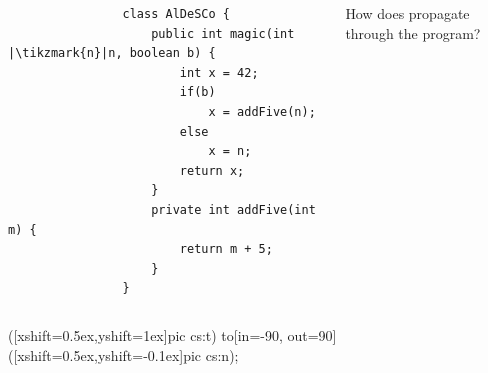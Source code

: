 \documentclass[aspectratio=169, usepdftitle=false, xcolor={dvipsnames}]{beamer}
\begin{document}
\begin{frame}[fragile]
{}
	\begin{columns}[c]
		\begin{column}{0.55\textwidth}
			\begin{dottedborder}
			\begin{verbatim}
				class AlDeSCo {
					public int magic(int |\tikzmark{n}|n, boolean b) {
						int x = 42;
						if(b)
							x = addFive(n);
						else
							x = n;
						return x;
					}
					private int addFive(int m) {
						return m + 5;
					}
				}
			\end{verbatim}
			\end{dottedborder}
		\end{column}
		\begin{column}{0.35\textwidth}
			\block How does  propagate through the program?\endblock\bigskip
			\centerline{}
		\end{column}
	\end{columns}
	 ([xshift=0.5ex,yshift=1ex]pic cs:t) to[in=-90, out=90] ([xshift=0.5ex,yshift=-0.1ex]pic cs:n);
\end{frame}
\end{document}

